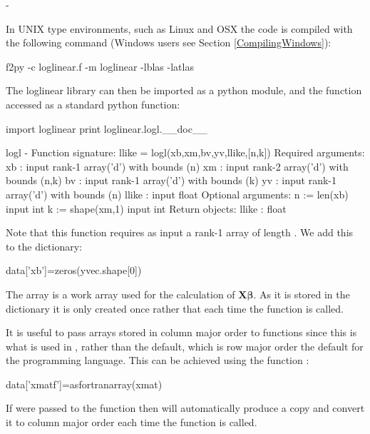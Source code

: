 -\documentclass[article]{jss}
\begin{document}
In UNIX type environments, such as Linux and OSX the code is compiled
with the following command (Windows users see Section
\ref{CompilingWindows}):

\begin{Code}
f2py -c loglinear.f -m loglinear -lblas -latlas
\end{Code}

The loglinear library can then be imported as a python module, and the function  accessed as a standard python function:

\begin{CodeChunk}
\begin{CodeInput}
import loglinear
print loglinear.logl.__doc__
\end{CodeInput}
\begin{CodeOutput}
logl - Function signature:
  llike = logl(xb,xm,bv,yv,llike,[n,k])
Required arguments:
  xb : input rank-1 array('d') with bounds (n)
  xm : input rank-2 array('d') with bounds (n,k)
  bv : input rank-1 array('d') with bounds (k)
  yv : input rank-1 array('d') with bounds (n)
  llike : input float
Optional arguments:
  n := len(xb) input int
  k := shape(xm,1) input int
Return objects:
  llike : float
\end{CodeOutput}
\end{CodeChunk}

Note that this function requires as input  a rank-1 array of length
. We add this to the  dictionary:
\begin{Code}
data['xb']=zeros(yvec.shape[0])
\end{Code}
The array  is a work array used for the
calculation of $\bm{X}\bm{\beta}.$ As it is stored in the
 dictionary  it is only created once
rather that each time the function  is called.

It is useful to pass arrays stored in column major order to 
functions since this is what is used in , rather
than the  default, which is row major order the
default for the  programming language. This can be
achieved using the  function :
\begin{Code}
data['xmatf']=asfortranarray(xmat)
\end{Code}
If  were passed to the function
 then  will automatically produce a
copy and convert it to column major order each time the function
 is called.
\end{document}
